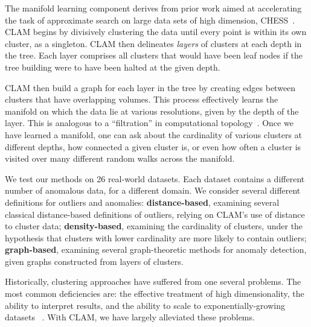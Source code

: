 The manifold learning component derives from prior work aimed at accelerating the task of approximate search on large data sets of high dimension, CHESS~\cite{ishaq2019entropy}.
CLAM begins by divisively clustering the data until every point is within its own cluster, as a singleton.
CLAM then delineates \textit{layers} of clusters at each depth in the tree.
Each layer comprises all clusters that would have been leaf nodes if the tree building were to have been halted at the given depth.

CLAM then build a graph for each layer in the tree by creating edges between clusters that have overlapping volumes.
This process effectively learns the manifold on which the data lie at various resolutions, given by the depth of the layer.
This is analogous to a ``filtration'' in computational topology~\cite{carlsson2009topology}.
Once we have learned a manifold, one can ask about the cardinality of various clusters at different depths, how connected a given cluster is, or even how often a cluster is visited over many different random walks across the manifold.

We test our methods on 26 real-world datasets. 
Each dataset contains a different number of anomalous data, for a different domain.
We consider several different definitions for outliers and anomalies: \textbf{distance-based}, examining several classical distance-based definitions of outliers, relying on CLAM's use of distance to cluster data; \textbf{density-based}, examining the cardinality of clusters, under the hypothesis that clusters with lower cardinality are more likely to contain outliers; \textbf{graph-based}, examining several graph-theoretic methods for anomaly detection, given graphs constructed from layers of clusters.

Historically, clustering approaches have suffered from one several problems.
The most common deficiencies are: the effective treatment of high dimensionality, the ability to interpret results, and the ability to scale to exponentially-growing datasets ~\cite{rakesh_agrawal_automatic_1998}.
With CLAM, we have largely alleviated these problems.
